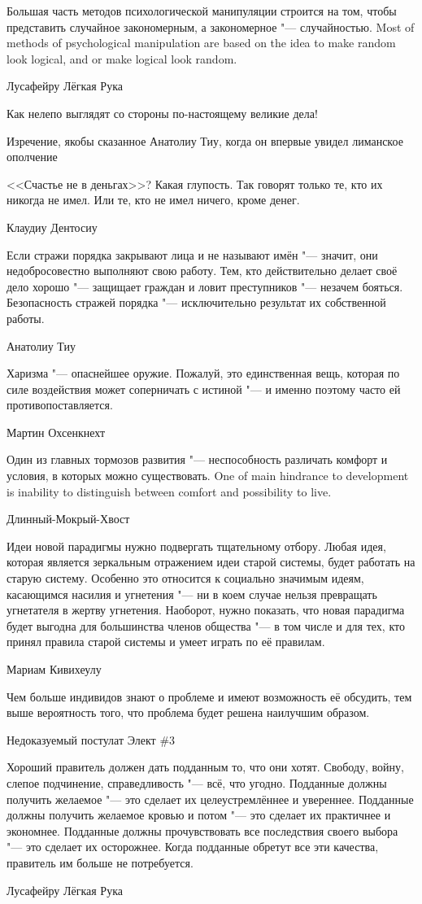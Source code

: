 \epigraph{
{Большая часть методов психологической манипуляции строится на том, чтобы представить случайное закономерным, а закономерное "--- случайностью.}
{Most of methods of psychological manipulation are based on the idea to make random look logical, and or make logical look random.}
}{Лусафейру Лёгкая Рука}

\epigraph
{Как нелепо выглядят со стороны по-настоящему великие дела!}
{Изречение, якобы сказанное Анатолиу Тиу, когда он впервые увидел лиманское ополчение}

\epigraph
{<<Счастье не в деньгах>>?
Какая глупость.
Так говорят только те, кто их никогда не имел.
Или те, кто не имел ничего, кроме денег.}
{Клаудиу Дентосиу}

\epigraph
{Если стражи порядка закрывают лица и не называют имён "--- значит, они недобросовестно выполняют свою работу.
Тем, кто действительно делает своё дело хорошо "--- защищает граждан и ловит преступников "--- незачем бояться.
Безопасность стражей порядка "--- исключительно результат их собственной работы.}
{Анатолиу Тиу}

\epigraph
{Харизма "--- опаснейшее оружие.
Пожалуй, это единственная вещь, которая по силе воздействия может соперничать с истиной "--- и именно поэтому часто ей противопоставляется.}
{Мартин Охсенкнехт}

\epigraph{
{Один из главных тормозов развития "--- неспособность различать комфорт и условия, в которых можно существовать.}
{One of main hindrance to development is inability to distinguish between comfort and possibility to live.}
}{Длинный-Мокрый-Хвост}

\epigraph
{Идеи новой парадигмы нужно подвергать тщательному отбору.
Любая идея, которая является зеркальным отражением идеи старой системы, будет работать на старую систему.
Особенно это относится к социально значимым идеям, касающимся насилия и угнетения "--- ни в коем случае нельзя превращать угнетателя в жертву угнетения.
Наоборот, нужно показать, что новая парадигма будет выгодна для большинства членов общества "--- в том числе и для тех, кто принял правила старой системы и умеет играть по её правилам.}
{Мариам Кивихеулу}

\epigraph
{Чем больше индивидов знают о проблеме и имеют возможность её обсудить, тем выше вероятность того, что проблема будет решена наилучшим образом.}
{Недоказуемый постулат Элект \#3}

\epigraph
{Хороший правитель должен дать подданным то, что они хотят.
Свободу, войну, слепое подчинение, справедливость "--- всё, что угодно.
Подданные должны получить желаемое "--- это сделает их целеустремлённее и увереннее.
Подданные должны получить желаемое кровью и потом "--- это сделает их практичнее и экономнее.
Подданные должны прочувствовать все последствия своего выбора "--- это сделает их осторожнее.
Когда подданные обретут все эти качества, правитель им больше не потребуется.}
{Лусафейру Лёгкая Рука}

